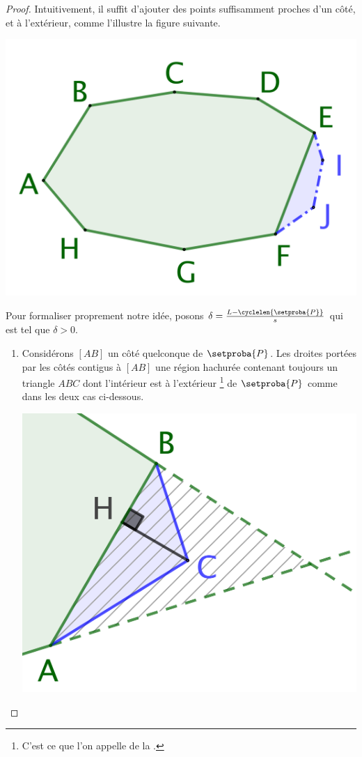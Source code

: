 \begin{proof}
    Intuitivement, il suffit d'ajouter des points suffisamment proches d'un côté, et à l'extérieur, comme l'illustre la figure suivante.
    \begin{center}
        \includegraphics[scale=.4]{bigger-convex.png}
    \end{center}

    Pour formaliser proprement notre idée, posons
    $\delta = \frac{L - \cyclelen{\setproba{P}}}{s}$ qui est tel que $\delta > 0$.
    \begin{enumerate}
        \item \label{add-vertex-start}
        Considérons $[AB]$ un côté quelconque de $\setproba{P}$.
        Les droites portées par les côtés contigus à $[AB]$  une région hachurée contenant toujours un triangle $ABC$ dont l'intérieur est à l'extérieur
        \footnote{
            C'est ce que l'on appelle de la .
        }
        de $\setproba{P}$ comme dans les deux cas ci-dessous.
        \begin{multicols}{2}
            \centering

            \includegraphics[scale=.35]{content/polygon/sol-must-be/add-vertex-1.png}


\end{multicols}
\end{enumerate}
\end{proof}
